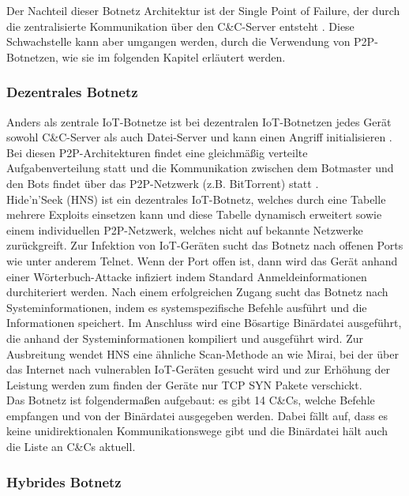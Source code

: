 Der Nachteil dieser Botnetz Architektur ist der Single Point of Failure, der durch die zentralisierte Kommunikation über den C\&C-Server entsteht \cite{DBLP:series/isc/Oorschot21}. Diese Schwachstelle kann aber umgangen werden, durch die Verwendung von P2P-Botnetzen, wie sie im folgenden Kapitel erläutert werden.

\subsubsection{Dezentrales Botnetz}

Anders als zentrale IoT-Botnetze ist bei dezentralen IoT-Botnetzen jedes Gerät sowohl C\&C-Server als auch Datei-Server und kann einen Angriff initialisieren \cite{Prokofiev_2019}. Bei diesen P2P-Architekturen findet eine gleichmäßig verteilte Aufgabenverteilung statt und die Kommunikation zwischen dem Botmaster und den Bots findet über das P2P-Netzwerk (z.B. BitTorrent) statt \cite{DBLP:journals/scn/DonnoDGS18}. \\[0.2in]

Hide'n'Seek \cite{Diaconescu2018HIDENSEEKAA} (HNS) ist ein dezentrales IoT-Botnetz, welches durch eine Tabelle mehrere Exploits einsetzen kann und diese Tabelle dynamisch erweitert sowie einem individuellen P2P-Netzwerk, welches nicht auf bekannte Netzwerke zurückgreift. Zur Infektion von IoT-Geräten sucht das Botnetz nach offenen Ports wie unter anderem Telnet. Wenn der Port offen ist, dann wird das Gerät anhand einer Wörterbuch-Attacke infiziert indem Standard Anmeldeinformationen durchiteriert werden. Nach einem erfolgreichen Zugang sucht das Botnetz nach Systeminformationen, indem es systemspezifische Befehle ausführt und die Informationen speichert. Im Anschluss wird eine Bösartige Binärdatei ausgeführt, die anhand der Systeminformationen kompiliert und ausgeführt wird. Zur Ausbreitung wendet HNS eine ähnliche Scan-Methode an wie Mirai, bei der über das Internet nach vulnerablen IoT-Geräten gesucht wird und zur Erhöhung der Leistung werden zum finden der Geräte nur TCP SYN Pakete verschickt.\\ Das Botnetz ist folgendermaßen aufgebaut: es gibt 14 C\&Cs, welche Befehle empfangen und von der Binärdatei ausgegeben werden. Dabei fällt auf, dass es keine unidirektionalen Kommunikationswege gibt und die Binärdatei hält auch die Liste an C\&Cs aktuell. 

\subsubsection{Hybrides Botnetz}

